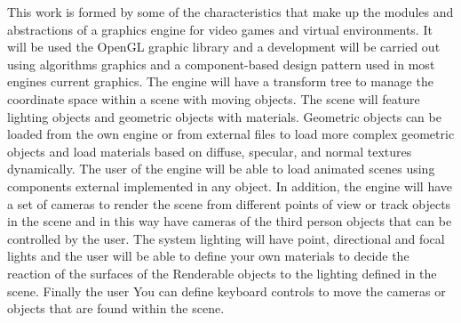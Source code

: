 \documentclass[a4paper, 17pt]{book}
\begin{document}
This work is formed by some of the characteristics that make up the modules
and abstractions of a graphics engine for video games and virtual environments. It will be used
the OpenGL graphic library and a development will be carried out using algorithms
graphics and a component-based design pattern used in most engines current graphics.
\bigbreak
The engine will have a transform tree to manage the coordinate space
within a scene with moving objects. The scene will feature lighting objects
and geometric objects with materials. Geometric objects can be loaded from the
own engine or from external files to load more complex geometric objects and
load materials based on diffuse, specular, and normal textures dynamically.
The user of the engine will be able to load animated scenes using components
external implemented in any object. In addition, the engine will have a set of
cameras to render the scene from different points of view
or track objects in the scene and in this way have cameras of the
third person objects that can be controlled by the user. The system
lighting will have point, directional and focal lights and the user will be able to
define your own materials to decide the reaction of the surfaces of the
Renderable objects to the lighting defined in the scene. Finally the user
You can define keyboard controls to move the cameras or objects that are found
within the scene.



\tableofcontents 
\cleardoublepage
\listoffigures %


\end{document}

